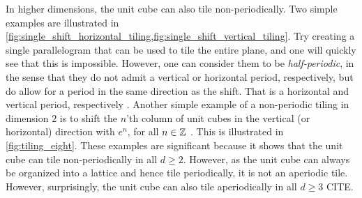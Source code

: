 \documentclass[../thesis.tex]{subfiles}
\begin{document}
In higher dimensions, the unit cube can also tile non-periodically. Two simple examples are illustrated in \cref{fig:single_shift_horizontal_tiling,fig:single_shift_vertical_tiling}. Try creating a single parallelogram that can be used to tile the entire plane, and one will quickly see that this is impossible. However, one can consider them to be \emph{half-periodic}, in the sense that they do not admit a vertical or horizontal period, respectively, but do allow for a period in the same direction as the shift. That is a horizontal and vertical period, respectively \cite{kolountzakisTilingsTranslation2010}. Another simple example of a non-periodic tiling in dimension $2$ is to shift the $n$'th column of unit cubes in the vertical (or horizontal) direction with $e^n$, for all $n\in\mathbb{Z}$ \cite{liuUniformityNonUniformGabor2003}. This is illustrated in \cref{fig:tiling_eight}. These examples are significant because it shows that the unit cube can tile non-periodically in all $d\geq 2$. However, as the unit cube can always be organized into a lattice and hence tile periodically, it is not an aperiodic tile. However, surprisingly, the unit cube can also tile aperiodically in all $d\geq 3$ CITE. 
%
%
\end{document}
